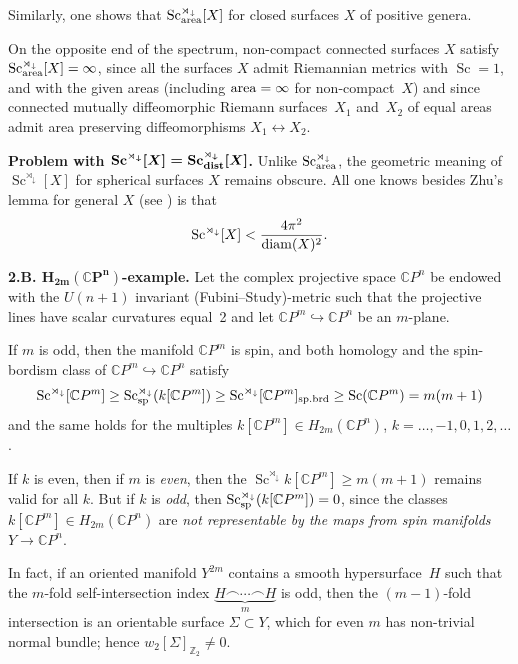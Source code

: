 \documentclass[pdftex]{sigma}
\numberwithin{equation}{section}
\begin{document}
Similarly, one shows that
$\operatorname{Sc}_{\rm area}^{\rtimes_\downarrow}[X]$ for closed surfaces $X$ of positive genera.

On the opposite end of the spectrum, non-compact connected surfaces $X$ satisfy
$\operatorname{Sc}_{\rm area}^{\rtimes_\downarrow}[X]=\infty$,
since all the surfaces $X$ admit Riemannian metrics
with $\operatorname{Sc}=1$, and with the given areas (including ${\rm area}=\infty$ for non-compact~$X$) and since connected mutually diffeomorphic Riemann surfaces~$X_1$ and~$X_2$ of equal areas admit area preserving diffeomorphisms $X_1\leftrightarrow X_2$.

\textbf{Problem with $\boldsymbol{\operatorname{Sc}^{\rtimes_\downarrow}[X]=\operatorname{Sc}_{\rm dist}^{\rtimes_\downarrow}[X]}$.} Unlike $\operatorname{Sc}_{\rm area}^{\rtimes_\downarrow}$, the geometric meaning of
$\operatorname{Sc}^{\rtimes_\downarrow}[X]$ for spherical surfaces $X$ remains obscure. All one knows besides Zhu's lemma for general $X$ (see  \cite[Section~2.8]{Gr2021}) is that
\[
\operatorname{Sc}^{\rtimes_\downarrow}[X]<{4\pi^2\over \operatorname{diam}(X)^2}.
\]

\textbf{2.B. $\boldsymbol{H_{2m}(\mathbb CP^n)}$-example.} Let the complex projective space $\mathbb CP^n$ be endowed with
 the $U(n+1)$ invariant
(Fubini--Study)-metric such that the projective lines have scalar curvatures equal~2
 and let $\mathbb CP^m\hookrightarrow \mathbb CP^n$ be an $m$-plane.

If $m$ is odd, then the manifold $\mathbb CP^m$ is spin, and both homology and the spin-bordism class of
$ \mathbb CP^m \hookrightarrow \mathbb CP^n$ satisfy
\[
\operatorname{Sc}^{\rtimes_\downarrow}[\mathbb CP^m]\geq \operatorname{Sc}_{\rm sp}^{\rtimes_\downarrow}(k[\mathbb CP^m])\geq \operatorname{Sc}^{\rtimes_\downarrow}[\mathbb CP^m]_{\rm sp.brd}\geq \operatorname{Sc}( \mathbb CP^m)=m(m+1)
\]
and the same holds for the multiples $k[\mathbb CP^m]\in H_{2m}(\mathbb CP^n)$, $k=\dots,-1,0,1,2,\dots$.

If $k$ is even, then
if $m$ is {\it even}, then the $\operatorname{Sc}^{\rtimes_\downarrow}k[\mathbb CP^m]\geq m(m+1)$ remains valid for all $k$.
But if
 $k$ is {\it odd}, then
$\operatorname{Sc}_{\rm sp}^{\rtimes_\downarrow}(k[\mathbb CP^m])= 0$,
 since the classes
$k[\mathbb CP^m ]\in H_{2m}(\mathbb CP^n)$ are {\it not representable by the maps from spin manifolds} $Y\to \mathbb CP^n$.

In fact,
if an oriented manifold $Y^{2m} $ contains a smooth hypersurface~$H$ such that the $m$-fold self-intersection index $\underset {m}{\underbrace {H\frown \cdots \frown H}}$ is odd, then
the $(m-1)$-fold intersection is an orientable surface $\Sigma\subset Y$, which for even $m$ has
non-trivial normal bundle; hence $w_2[\Sigma]_{\mathbb Z_2}\neq 0$.
\end{document}
